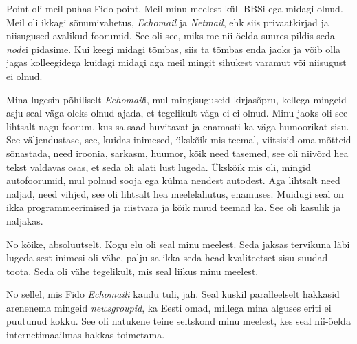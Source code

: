 
Point oli meil puhas Fido point. Meil minu meelest küll BBSi ega midagi olnud. 
Meil oli ikkagi sõnumivahetus, \emph{Echomail} ja \emph{Netmail}, ehk siis 
privaatkirjad ja niisugused avalikud foorumid. See oli see, miks me nii-öelda 
suures pildis seda \emph{node}i pidasime. Kui keegi midagi tõmbas, siis ta 
tõmbas enda jaoks ja võib olla jagas  kolleegidega kuidagi midagi aga meil 
mingit sihukest varamut või niisugust ei olnud.


Mina lugesin põhiliselt \emph{Echomail}i, mul mingisuguseid kirjasõpru, kellega 
mingeid asju seal väga oleks olnud ajada, et tegelikult väga ei ei olnud. Minu 
jaoks oli see lihtsalt nagu foorum, kus sa saad huvitavat ja enamasti ka väga 
humoorikat  sisu. See väljendustase, see, kuidas inimesed, ükskõik mis teemal, 
viitsisid oma mõtteid sõnastada, need iroonia, sarkasm, huumor, kõik need 
tasemed, see oli niivõrd hea tekst valdavas osas, et seda oli  alati lust 
lugeda. Ükskõik mis oli, mingid autofoorumid, mul polnud  sooja ega külma 
nendest autodest. Aga lihtsalt need naljad, need vihjed, see oli lihtsalt hea 
meelelahutus, enamuses. Muidugi seal on ikka programmeerimised ja riistvara ja 
kõik muud teemad ka. See oli kasulik ja naljakas.


No kõike, absoluutselt. Kogu elu oli seal minu meelest. Seda jaksas tervikuna 
läbi lugeda sest inimesi oli vähe, palju sa ikka seda head kvaliteetset sisu 
suudad toota. Seda  oli vähe tegelikult, mis seal liikus minu meelest.


No sellel, mis Fido \emph{Echomaili} kaudu tuli, jah. Seal kuskil paralleelselt 
hakkasid arenenema mingeid \emph{newsgroupid}, ka Eesti omad, millega mina 
alguses eriti ei puutunud  kokku. See oli natukene teine seltskond minu 
meelest, kes seal nii-öelda internetimaailmas hakkas toimetama. 



